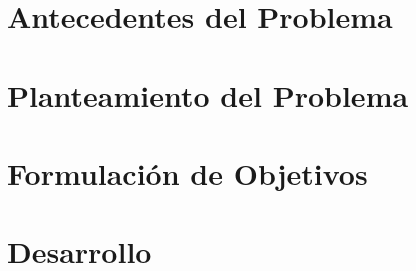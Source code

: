 \documentclass[stu, 12pt, spanish, donotrepeattitle, floatsintext]{apa7}
\newcommand{\incl}[1]{}
\begin{document}

\justifying
\setlength{\parindent}{0.5in}
\linespread{1.5}\selectfont %

\renewcommand{\contentsname}{Índice}
\setcounter{tocdepth}{2}
\tableofcontents

\newpage
\incl{01_introduccion/01_resumen}
\newpage
\incl{01_introduccion/03_introduccion}

\newpage
\section{Antecedentes del Problema}
\incl{02_capitulo1_perfil/01_antecedentes}
\incl{04_capitulo3_empresa/01_empresa_identidad}
\incl{04_capitulo3_empresa/02_estructura_organizacional}
\incl{04_capitulo3_empresa/04_modelo_negocio}
\incl{04_capitulo3_empresa/05_flujo_operativo}

\newpage
\section{Planteamiento del Problema}
\incl{02_capitulo1_perfil/02_definicion_problema}
\incl{02_capitulo1_perfil/04_justificacion}

\newpage
\section{Formulación de Objetivos}
\incl{02_capitulo1_perfil/03_objetivos}
\incl{02_capitulo1_perfil/06_alcances_limitaciones}

\newpage
\section{Desarrollo}
\incl{11_feria/propuesta_solucion}
\incl{11_feria/canvas_foda}
\incl{07_capitulo5_requisitos/01_identificacion_actores}
\incl{07_capitulo5_requisitos/02_identificacion_casos_uso}
\incl{09_capitulo7_diseno/02_diagrama_clase}
\incl{11_feria/diseno_datos}
\incl{10_capitulo8_implementacion/01_arquitectura_sistema}
\incl{10_capitulo8_implementacion/03_herramientas}
\end{document}
